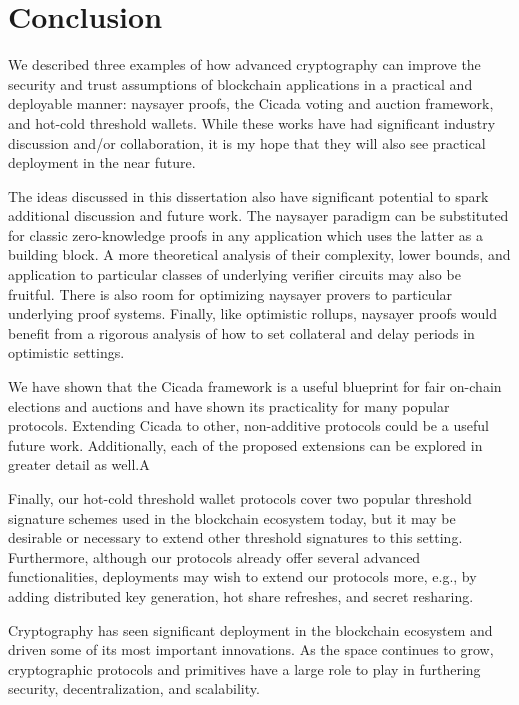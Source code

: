 \chapter{Conclusion}\label{sec:conclusion}

We described three examples of how advanced cryptography can improve the security and trust assumptions of blockchain applications in a practical and deployable manner: naysayer proofs, the Cicada voting and auction framework, and hot-cold threshold wallets. While these works have had significant industry discussion and/or collaboration, it is my hope that they will also see practical deployment in the near future. 

The ideas discussed in this dissertation also have significant potential to spark additional discussion and future work. The naysayer paradigm can be substituted for classic zero-knowledge proofs in any application which uses the latter as a building block. A more theoretical analysis of their complexity, lower bounds, and application to particular classes of underlying verifier circuits may also be fruitful. There is also room for optimizing naysayer provers to particular underlying proof systems. Finally, like optimistic rollups, naysayer proofs would benefit from a rigorous analysis of how to set collateral and delay periods in optimistic settings.

We have shown that the Cicada framework is a useful blueprint for fair on-chain elections and auctions and have shown its practicality for many popular protocols. Extending Cicada to other, non-additive protocols could be a useful future work. Additionally, each of the proposed extensions can be explored in greater detail as well.A

Finally, our hot-cold threshold wallet protocols cover two popular threshold signature schemes used in the blockchain ecosystem today, but it may be desirable or necessary to extend other threshold signatures to this setting. Furthermore, although our protocols already offer several advanced functionalities, deployments may wish to extend our protocols more, e.g., by adding distributed key generation, hot share refreshes, and secret resharing.

Cryptography has seen significant deployment in the blockchain ecosystem and driven some of its most important innovations. As the space continues to grow, cryptographic protocols and primitives have a large role to play in furthering security, decentralization, and scalability.